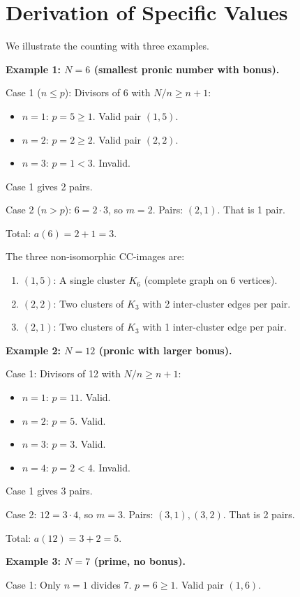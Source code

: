 \documentclass[11pt,a4paper]{article}
\theoremstyle{definition}
\begin{document}
\section{Derivation of Specific Values}

We illustrate the counting with three examples.

\textbf{Example 1: $N = 6$ (smallest pronic number with bonus).}

Case 1 ($n \leq p$): Divisors of 6 with $N/n \geq n+1$:
\begin{itemize}
\item $n = 1$: $p = 5 \geq 1$. Valid pair $(1, 5)$.
\item $n = 2$: $p = 2 \geq 2$. Valid pair $(2, 2)$.
\item $n = 3$: $p = 1 < 3$. Invalid.
\end{itemize}
Case 1 gives 2 pairs.

Case 2 ($n > p$): $6 = 2 \cdot 3$, so $m = 2$. Pairs: $(2, 1)$. That is 1 pair.

Total: $a(6) = 2 + 1 = 3$.

The three non-isomorphic CC-images are:
\begin{enumerate}
\item $(1, 5)$: A single cluster $K_6$ (complete graph on 6 vertices).
\item $(2, 2)$: Two clusters of $K_3$ with 2 inter-cluster edges per pair.
\item $(2, 1)$: Two clusters of $K_3$ with 1 inter-cluster edge per pair.
\end{enumerate}

\textbf{Example 2: $N = 12$ (pronic with larger bonus).}

Case 1: Divisors of 12 with $N/n \geq n+1$:
\begin{itemize}
\item $n = 1$: $p = 11$. Valid.
\item $n = 2$: $p = 5$. Valid.
\item $n = 3$: $p = 3$. Valid.
\item $n = 4$: $p = 2 < 4$. Invalid.
\end{itemize}
Case 1 gives 3 pairs.

Case 2: $12 = 3 \cdot 4$, so $m = 3$. Pairs: $(3, 1), (3, 2)$. That is 2 pairs.

Total: $a(12) = 3 + 2 = 5$.

\textbf{Example 3: $N = 7$ (prime, no bonus).}

Case 1: Only $n = 1$ divides 7. $p = 6 \geq 1$. Valid pair $(1, 6)$.
\end{document}

